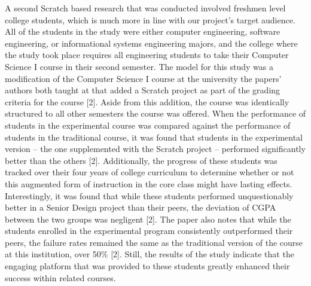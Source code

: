 A second Scratch based research that was conducted involved freshmen level college students, which is much more in line with our project's target audience. All of the students in the study were either computer engineering, software engineering, or informational systems engineering majors, and the college where the study took place requires all engineering students to take their Computer Science I course in their second semester. The model for this study was a modification of the Computer Science I course at the university the papers' authors both taught at that added a Scratch project as part of the grading criteria for the course [2]. Aside from this addition, the course was identically structured to all other semesters the course was offered. When the performance of students in the experimental course was compared against the performance of students in the traditional course, it was found that students in the experimental version -- the one supplemented with the Scratch project -- performed significantly better than the others [2]. Additionally, the progress of these students was tracked over their four years of college curriculum to determine whether or not this augmented form of instruction in the core class might have lasting effects. Interestingly, it was found that while these students performed unquestionably better in a Senior Design project than their peers, the deviation of CGPA between the two groups was negligent [2]. The paper also notes that while the students enrolled in the experimental program consistently outperformed their peers, the failure rates remained the same as the traditional version of the course at this institution, over 50\% [2]. Still, the results of the study indicate that the engaging platform that was provided to these students greatly enhanced their success within related courses.\\

